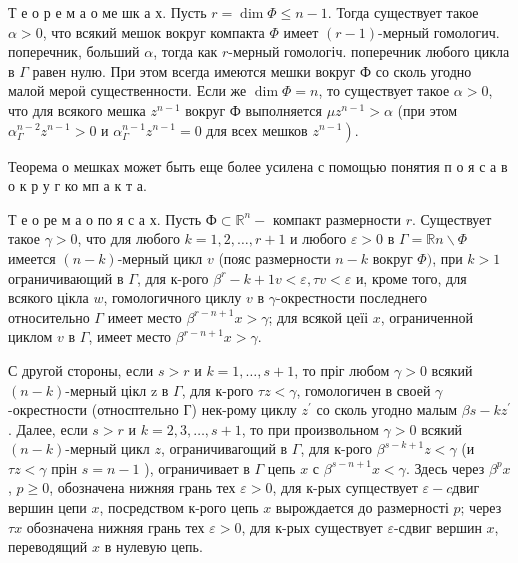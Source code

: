 \documentclass[10pt]{article}
\begin{document}
Т е о р е м а о ме шк а х. Пусть $r=\operatorname{dim} \Phi \leqslant n-1$. Тогда существует такое $\alpha>0$, что всякий мешок вокруг компакта $\Phi$ имеет $(r-1)$-мерный гомологич. поперечник, больший $\alpha$, тогда как $r$-мерный гомологіч. поперечник любого цикла в $\Gamma$ равен нулю. При этом всегда имеются мешки вокруг Ф со сколь угодно малой мероӥ существенности. Если же $\operatorname{dim} \Phi=n$, то существует такое $\alpha>0$, что для всякого мешка $z^{n-1}$ вокруг Ф выполняется $\mu z^{n-1}>\alpha$ (при этом $\alpha_{\Gamma}^{n-2} z^{n-1}>0$ и $\alpha_{\Gamma}^{n-1} z^{n-1}=0$ для всех мешков $\left.z^{n-1}\right)$.



Теорема о мешках может быть еще более усилена с помощью понятия п о я с а в о к р у г ко мп а к т а.



Т е о ре м а о по я с а х. Пусть $Ф \subset \mathbb{R}^{n}-$ компакт размерности $r$. Существует такое $\gamma>0$, что для любого $k=1,2, \ldots, r+1$ и любого $\varepsilon>0$ в $\Gamma=\mathbb{R} n \backslash \Phi$ имеется $(n-k)$-мерный цикл $v$ (пояс размерности $n-k$ вокруг $\Phi)$, при $k>1$ ограничивающий в $\Gamma$, для к-рого $\beta^{r}-k+1 v<\varepsilon, \tau v<\varepsilon$ и, кроме того, для всякого цікла $w$, гомологичного циклу $v$ в $\gamma$-окрестности последнего относительно $\Gamma$ имеет место $\beta^{r-n+1} x>\gamma$; для всякой цеїі $x$, ограниченной циклом $v$ в $\Gamma$, имеет место $\beta^{r-n+1} x>\gamma$.



С другой стороны, если $s>r$ и $k=1, \ldots, s+1$, то пріг любом $\gamma>0$ всякий $(n-k)$-мерный цікл z в $\Gamma$, для к-рого $\tau z<\gamma$, гомологичен в своей $\gamma$-окрестности (относптельно Г) нек-рому циклу $z^{\prime}$ со сколь угодно малым $\beta s-k z^{\prime}$. Далее, если $s>r$ и $k=2,3, \ldots, s+1$, то при произвольном $\gamma>0$ всякий $(n-k)$-мерный цикл $z$, ограничивагощий в $\Gamma$, для к-рого $\beta^{s-k+1} z<\gamma$ (и $\tau z<\gamma$ прін $s=n-1$ ), ограничивает в $\Gamma$ цепь $x$ с $\beta^{s-n+1} x<\gamma$. Здесь через $\beta^{p} x$, $p \geqslant 0$, обозначена нижняя грань тех $\varepsilon>0$, для к-рых супцествует $\varepsilon-c д в и г$ вершин цепи $x$, посредством к-рого цепь $x$ вырождается до размерності $p$; через $\tau x$ обозначена нижняя грань тех $\varepsilon>0$, для к-рых существует $\varepsilon$-сдвиг вершин $x$, переводящий $x$ в нулевую цепь.
\end{document}
